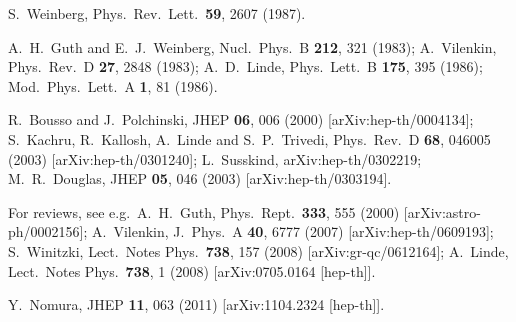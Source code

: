 \documentclass[12pt]{article}
\begin{document}
\begin{thebibliography}{99}

S.~Weinberg,
Phys.\ Rev.\ Lett.\ {\bf 59}, 2607 (1987).

A.~H.~Guth and E.~J.~Weinberg,
Nucl.\ Phys.\ B {\bf 212}, 321 (1983);
A.~Vilenkin,
Phys.\ Rev.\ D {\bf 27}, 2848 (1983);
A.~D.~Linde,
Phys.\ Lett.\ B {\bf 175}, 395 (1986);
Mod.\ Phys.\ Lett.\ A {\bf 1}, 81 (1986).

R.~Bousso and J.~Polchinski,
JHEP {\bf 06}, 006 (2000)
[arXiv:hep-th/0004134];
S.~Kachru, R.~Kallosh, A.~Linde and S.~P.~Trivedi,
Phys.\ Rev.\ D {\bf 68}, 046005 (2003)
[arXiv:hep-th/0301240];
L.~Susskind,
arXiv:hep-th/0302219;
M.~R.~Douglas,
JHEP {\bf 05}, 046 (2003)
[arXiv:hep-th/0303194].

For reviews, see e.g.\
A.~H.~Guth,
Phys.\ Rept.\ {\bf 333}, 555 (2000)
[arXiv:astro-ph/0002156];
A.~Vilenkin,
J.\ Phys.\ A {\bf 40}, 6777 (2007)
[arXiv:hep-th/0609193];
S.~Winitzki,
Lect.\ Notes Phys.\ {\bf 738}, 157 (2008)
[arXiv:gr-qc/0612164];
A.~Linde,
Lect.\ Notes Phys.\ {\bf 738}, 1 (2008)
[arXiv:0705.0164 [hep-th]].

Y.~Nomura,
JHEP {\bf 11}, 063 (2011)
[arXiv:1104.2324 [hep-th]].


\end{thebibliography}
\end{document}

